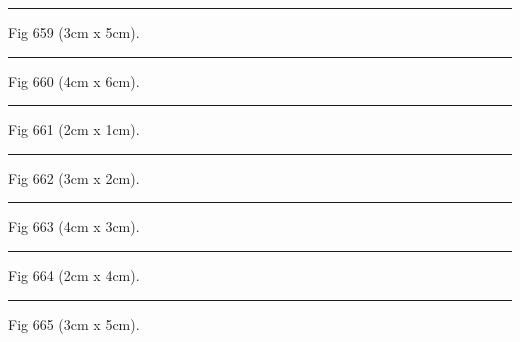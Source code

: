 \documentclass[a4paper,11pt]{article}
\begin{document}
\begin{swarmwrap}%
  \begin{minipage}[t]{3cm}
    \centering
    \rule{\linewidth}{5cm}
    {\footnotesize Fig 659 (3cm x 5cm).}
  \end{minipage}%
\end{swarmwrap}%
\swarmwrapnext
\lipsum[59]%

\begin{swarmwrap}%
  \begin{minipage}[t]{4cm}
    \centering
    \rule{\linewidth}{6cm}
    {\footnotesize Fig 660 (4cm x 6cm).}
  \end{minipage}%
\end{swarmwrap}%
\swarmwrapnext
\lipsum[60]%

\begin{swarmwrap}%
  \begin{minipage}[t]{2cm}
    \centering
    \rule{\linewidth}{1cm}
    {\footnotesize Fig 661 (2cm x 1cm).}
  \end{minipage}%
\end{swarmwrap}%
\swarmwrapnext
\lipsum[61]%

\begin{swarmwrap}%
  \begin{minipage}[t]{3cm}
    \centering
    \rule{\linewidth}{2cm}
    {\footnotesize Fig 662 (3cm x 2cm).}
  \end{minipage}%
\end{swarmwrap}%
\swarmwrapnext
\lipsum[62]%

\begin{swarmwrap}%
  \begin{minipage}[t]{4cm}
    \centering
    \rule{\linewidth}{3cm}
    {\footnotesize Fig 663 (4cm x 3cm).}
  \end{minipage}%
\end{swarmwrap}%
\swarmwrapnext
\lipsum[63]%

\begin{swarmwrap}%
  \begin{minipage}[t]{2cm}
    \centering
    \rule{\linewidth}{4cm}
    {\footnotesize Fig 664 (2cm x 4cm).}
  \end{minipage}%
\end{swarmwrap}%
\swarmwrapnext
\lipsum[64]%

\begin{swarmwrap}%
  \begin{minipage}[t]{3cm}
    \centering
    \rule{\linewidth}{5cm}
    {\footnotesize Fig 665 (3cm x 5cm).}
  \end{minipage}%
\end{swarmwrap}%
\swarmwrapnext
\lipsum[65]%
\end{document}
